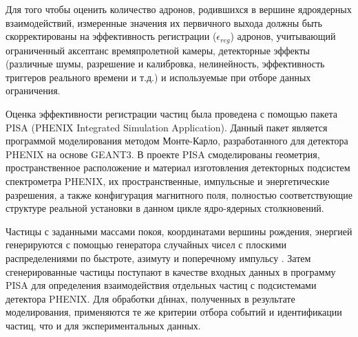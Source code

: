 
Для того чтобы оценить количество адронов, родившихся в вершине ядроядерных взаимодействий, измеренные значения их первичного выхода должны быть скорректированы на эффективность регистрации ($\epsilon_{reg}$) адронов, учитывающий ограниченный аксептанс времяпролетной камеры, детекторные эффекты (различные шумы, разрешение и калибровка, нелинейность, эффективность триггеров реального времени и т.д.) и используемые при отборе данных ограничения.

Оценка эффективности регистрации частиц была проведена с помощью пакета PISA (PHENIX Integrated Simulation Application). Данный пакет является программой моделирования методом Монте-Карло, разработанного для детектора PHENIX на основе GEANT3.
В проекте PISA смоделированы геометрия, пространственное расположение и материал изготовления детекторных подсистем спектрометра PHENIX, их пространственные, импульсные и энергетические разрешения, а также конфигурация магнитного поля, полностью соответствующие структуре реальной установки в данном цикле ядро-ядерных столкновений.

Частицы с заданными массами покоя, координатами вершины рождения, энергией генерируются с помощью генератора  случайных чисел с плоскими распределениями по быстроте, азимуту и поперечному импульсу \pt. Затем сгенерированные частицы поступают в качестве входных данных в программу PISA для определения взаимодействия отдельных частиц с подсистемами детектора PHENIX. 
Для обработки дfннах, полученных в результате моделирования, применяются те же критерии отбора событий и идентификации частиц, что и для экспериментальных данных.

